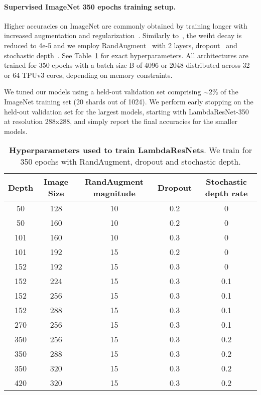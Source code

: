 \documentclass{article} \usepackage{iclr2021_conference,times}
\begin{document}
\paragraph{Supervised ImageNet 350 epochs training setup.}
Higher accuracies on ImageNet are commonly obtained by training longer with increased augmentation and regularization~\citep{lee2020compounding,tan2019efficientnet}.
Similarly to~\cite{bello2021revisiting}, the weiht decay is reduced to 4e-5 and we employ RandAugment~\citep{cubuk2019randaugment} with 2 layers, dropout~\citep{JMLR:v15:srivastava14a} and stochastic depth~\citep{huang2016deep}.
See Table~\ref{tab:pareto_curve_hparams} for exact hyperparameters.
All architectures are trained for 350 epochs with a batch size B of 4096 or 2048 distributed
across 32 or 64 TPUv3 cores, depending on memory constraints.

We tuned our models using a held-out validation set comprising $\sim$2\% of the ImageNet training set (20 shards out of 1024).
We perform early stopping on the held-out validation set for the largest models, starting with LambdaResNet-350 at resolution 288x288, and simply report the final accuracies for the smaller models.

\begin{table}[h!]
\begin{center}
\begin{tabular}{cc|ccc}
    \toprule
    Depth & Image Size & RandAugment magnitude & Dropout & Stochastic depth rate \\
    \midrule
    50 & 128 & 10 & 0.2 & 0 \\
    50 & 160 & 10 & 0.2 & 0 \\
    101 & 160 & 10 & 0.3 & 0 \\
    101 & 192 & 15 & 0.2 & 0 \\
    152 & 192 & 15 & 0.3 & 0 \\
    152 & 224 & 15 & 0.3 & 0.1 \\
    152 & 256 & 15 & 0.3 & 0.1 \\
    152 & 288 & 15 & 0.3 & 0.1 \\
    270 & 256 & 15 & 0.3 & 0.1 \\
    350 & 256 & 15 & 0.3 & 0.2 \\
    350 & 288 & 15 & 0.3 & 0.2 \\
    350 & 320 & 15 & 0.3 & 0.2 \\
    420 & 320 & 15 & 0.3 & 0.2 \\
    \bottomrule
\end{tabular}
\end{center}
\caption{
\textbf{Hyperparameters used to train LambdaResNets}. We train for 350 epochs with RandAugment, dropout and stochastic depth.}
\label{tab:pareto_curve_hparams} 
\end{table}
\end{document}
